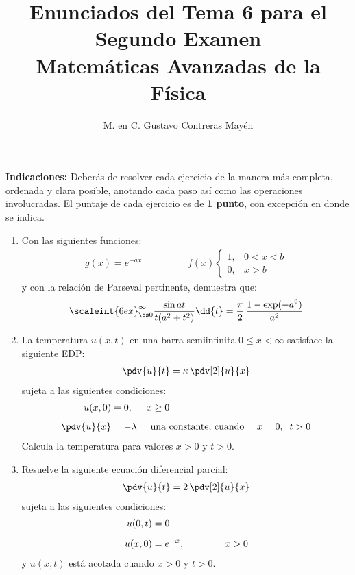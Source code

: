 
\title{Enunciados del Tema 6 para el Segundo Examen \\[0.3em]  \large{Matemáticas Avanzadas de la Física}\vspace{-3ex}}
\author{M. en C. Gustavo Contreras Mayén}
\date{ }

\vspace{-4cm}
\maketitle
\fontsize{14}{14}\selectfont

\textbf{Indicaciones: } Deberás de resolver cada ejercicio de la manera más completa, ordenada y clara posible, anotando cada paso así como las operaciones involucradas. El puntaje de cada ejercicio es de \textbf{1 punto}, con excepción en donde se indica.

\begin{enumerate}
\item Con las siguientes funciones:
\begin{align*}
g (x) = e^{-a x} \hspace{2cm} f (x) \begin{cases}
1, & 0 < x < b \\
0, & x > b
\end{cases} 
\end{align*}
y con la relación de Parseval pertinente, demuestra que:
\begin{align*}
\scaleint{6ex}_{\bs 0}^{\infty} \dfrac{\sin a t}{t (a^{2} + t^{2})} \dd{t} = \dfrac{\pi}{2} \, \dfrac{1 - \exp(-a^{2})}{a^{2}}
\end{align*}

\item La temperatura $u (x, t)$ en una barra semiinfinita $0 \leq x < \infty$ satisface la siguiente EDP:
\begin{align*}
\pdv{u}{t} =\kappa \, \pdv[2]{u}{x}
\end{align*}
sujeta a las siguientes condiciones:
\begin{align*}
u (x, 0) &= 0, \hspace{0.5cm} x \geq 0 \\[0.5em]
\pdv{u}{x} &= - \lambda \hspace{0.5cm} \mbox{una constante, cuando \quad} x = 0, \hspace{0.2cm} t > 0  
\end{align*}
Calcula la temperatura para valores $x > 0$ y $t > 0$.

\item Resuelve la siguiente ecuación diferencial parcial:
\begin{align*}
\pdv{u}{t} = 2 \, \pdv[2]{u}{x}
\end{align*}
sujeta a las siguientes condiciones:
\begin{align*}
u (0, t) &= 0 \\[0.5em]
u (x, 0) &= e^{-x}, \hspace{1.5cm} x > 0
\end{align*}
y $u(x, t)$ está acotada cuando $x > 0$ y $t > 0$.
\end{enumerate}
